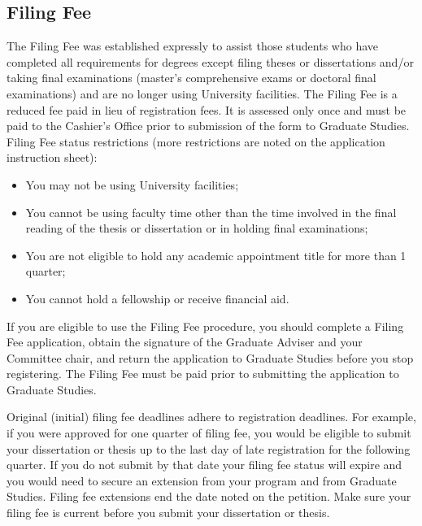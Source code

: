 \subsection{Filing Fee}
%
The Filing Fee was established expressly to assist those students who have completed all requirements for degrees except filing theses or dissertations and/or taking final examinations (master's comprehensive exams or doctoral final examinations) and are no longer using University facilities. The Filing Fee is a reduced fee paid in lieu of registration fees. It is assessed only once and must be paid to the Cashier's Office prior to submission of the form to Graduate Studies. Filing Fee status restrictions (more restrictions are noted on the application instruction sheet):
%
\begin{itemize}
  \item You may not be using University facilities;
  \item You cannot be using faculty time other than the time involved in the final reading of the thesis or dissertation or in holding final examinations;
  \item You are not eligible to hold any academic appointment title for more than 1 quarter;
  \item You cannot hold a fellowship or receive financial aid.
\end{itemize}

If you are eligible to use the Filing Fee procedure, you should complete a Filing Fee application, obtain the signature of the Graduate Adviser and your Committee chair, and return the application to Graduate Studies before you stop registering. The Filing Fee must be paid prior to submitting the application to Graduate Studies.

Original (initial) filing fee deadlines adhere to registration deadlines. For example, if you were approved for one quarter of filing fee, you would be eligible to submit your dissertation or thesis up to the last day of late registration for the following quarter. If you do not submit by that date your filing fee status will expire and you would need to secure an extension from your program and from Graduate Studies. Filing fee extensions end the date noted on the petition. Make sure your filing fee is current before you submit your dissertation or thesis.
